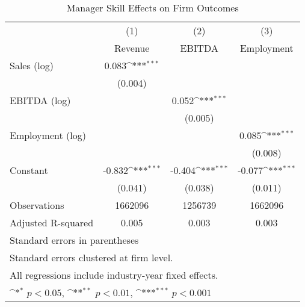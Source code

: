 \begin{table}[htbp]\centering
\def\sym#1{\ifmmode^{#1}\else\(^{#1}\)\fi}
\caption{Manager Skill Effects on Firm Outcomes}
\begin{tabular}{l*{3}{c}}
\toprule
                    &\multicolumn{1}{c}{(1)}&\multicolumn{1}{c}{(2)}&\multicolumn{1}{c}{(3)}\\
                    &\multicolumn{1}{c}{Revenue}&\multicolumn{1}{c}{EBITDA}&\multicolumn{1}{c}{Employment}\\
\midrule
Sales (log)         &       0.083\sym{***}&                     &                     \\
                    &     (0.004)         &                     &                     \\
\addlinespace
EBITDA (log)        &                     &       0.052\sym{***}&                     \\
                    &                     &     (0.005)         &                     \\
\addlinespace
Employment (log)    &                     &                     &       0.085\sym{***}\\
                    &                     &                     &     (0.008)         \\
\addlinespace
Constant            &      -0.832\sym{***}&      -0.404\sym{***}&      -0.077\sym{***}\\
                    &     (0.041)         &     (0.038)         &     (0.011)         \\
\midrule
Observations        &     1662096         &     1256739         &     1662096         \\
Adjusted R-squared  &       0.005         &       0.003         &       0.003         \\
\bottomrule
\multicolumn{4}{l}{\footnotesize Standard errors in parentheses}\\
\multicolumn{4}{l}{\footnotesize Standard errors clustered at firm level.}\\
\multicolumn{4}{l}{\footnotesize All regressions include industry-year fixed effects.}\\
\multicolumn{4}{l}{\footnotesize \sym{*} \(p<0.05\), \sym{**} \(p<0.01\), \sym{***} \(p<0.001\)}\\
\end{tabular}
\end{table}

